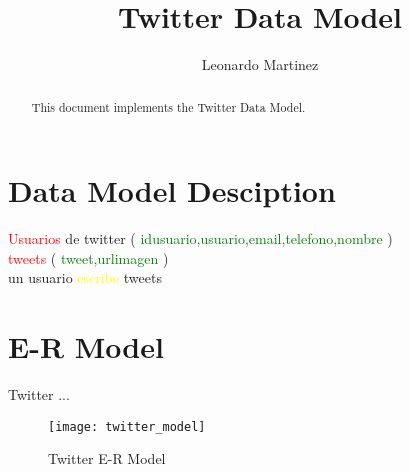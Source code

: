 \documentclass[10pt]{article}         %
\title{Twitter Data Model}
\author{Leonardo Martinez}
\begin{document}
\maketitle

\begin{abstract}
This document implements the Twitter Data Model.
\end{abstract}

\section{Data Model Desciption}


\textcolor{red}{Usuarios} de twitter ( \textcolor{green}{idusuario,usuario,email,telefono,nombre} )\\

\textcolor{red}{tweets} ( \textcolor{green}{tweet,urlimagen} )\\

un usuario \textcolor{yellow}{escribe} tweets

\section{E-R Model}

Twitter ...
\begin{figure}[h]
     \texttt{[image: twitter\_model]}
     \caption{Twitter E-R Model}
\end{figure}
\end{document}
